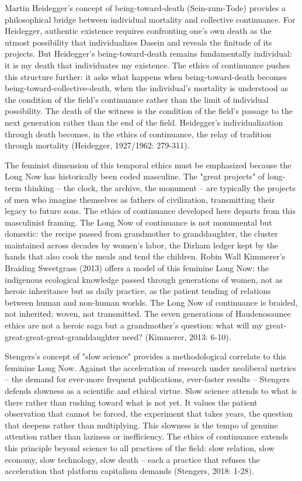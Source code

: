 Martin Heidegger's concept of being-toward-death (Sein-zum-Tode) provides a philosophical bridge between individual mortality and collective continuance. For Heidegger, authentic existence requires confronting one's own death as the utmost possibility that individualizes Dasein and reveals the finitude of its projects. But Heidegger's being-toward-death remains fundamentally individual: it is my death that individuates my existence. The ethics of continuance pushes this structure further: it asks what happens when being-toward-death becomes being-toward-collective-death, when the individual's mortality is understood as the condition of the field's continuance rather than the limit of individual possibility. The death of the witness is the condition of the field's passage to the next generation rather than the end of the field. Heidegger's individualization through death becomes, in the ethics of continuance, the relay of tradition through mortality (Heidegger, 1927/1962: 279-311).

The feminist dimension of this temporal ethics must be emphasized because the Long Now has historically been coded masculine. The "great projects" of long-term thinking -- the clock, the archive, the monument -- are typically the projects of men who imagine themselves as fathers of civilization, transmitting their legacy to future sons. The ethics of continuance developed here departs from this masculinist framing. The Long Now of continuance is not monumental but domestic: the recipe passed from grandmother to granddaughter, the cluster maintained across decades by women's labor, the Dirham ledger kept by the hands that also cook the meals and tend the children. Robin Wall Kimmerer's Braiding Sweetgrass (2013) offers a model of this feminine Long Now: the indigenous ecological knowledge passed through generations of women, not as heroic inheritance but as daily practice, as the patient tending of relations between human and non-human worlds. The Long Now of continuance is braided, not inherited; woven, not transmitted. The seven generations of Haudenosaunee ethics are not a heroic saga but a grandmother's question: what will my great-great-great-great-granddaughter need? (Kimmerer, 2013: 6-10).

Stengers's concept of "slow science" provides a methodological correlate to this feminine Long Now. Against the acceleration of research under neoliberal metrics -- the demand for ever-more frequent publications, ever-faster results -- Stengers defends slowness as a scientific and ethical virtue. Slow science attends to what is there rather than rushing toward what is not yet. It values the patient observation that cannot be forced, the experiment that takes years, the question that deepens rather than multiplying. This slowness is the tempo of genuine attention rather than laziness or inefficiency. The ethics of continuance extends this principle beyond science to all practices of the field: slow relation, slow economy, slow technology, slow death -- each a practice that refuses the acceleration that platform capitalism demands (Stengers, 2018: 1-28).

